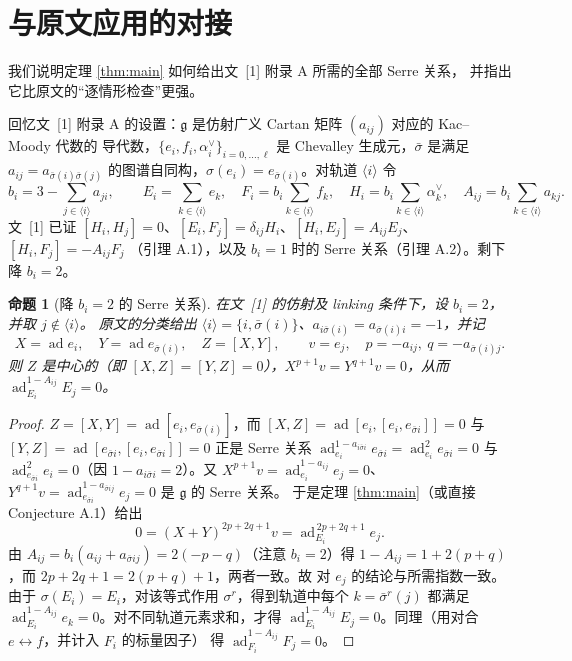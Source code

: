 \documentclass[11pt,UTF8]{ctexart}
\newtheorem{proposition}[theorem]{命题}
\theoremstyle{definition}
\newcommand{\ad}{\operatorname{ad}}
\newcommand{\g}{\mathfrak{g}}
\newcommand{\sbar}{\bar\sigma}
\begin{document}
\section{与原文应用的对接}\label{sec:app}

我们说明定理 \ref{thm:main} 如何给出文~[1] 附录 A 所需的全部 Serre 关系，
并指出它比原文的“逐情形检查”更强。

回忆文~[1] 附录 A 的设置：$\g$ 是仿射广义 Cartan 矩阵 $(a_{ij})$ 对应的 Kac--Moody 代数的
导代数，$\{e_i,f_i,\alpha_i^\vee\}_{i=0,\dots,\ell}$ 是 Chevalley 生成元，$\sbar$ 是满足
$a_{ij}=a_{\sbar(i)\sbar(j)}$ 的图谱自同构，$\sigma(e_i)=e_{\sbar(i)}$。对轨道 $\langle i\rangle$ 令
\[
b_i=3-\sum_{j\in\langle i\rangle}a_{ji},\qquad
E_i=\sum_{k\in\langle i\rangle}e_k,\quad
F_i=b_i\sum_{k\in\langle i\rangle}f_k,\quad
H_i=b_i\sum_{k\in\langle i\rangle}\alpha_k^\vee,\quad
A_{ij}=b_i\sum_{k\in\langle i\rangle}a_{kj}.
\]
文~[1] 已证 $[H_i,H_j]=0$、$[E_i,F_j]=\delta_{ij}H_i$、$[H_i,E_j]=A_{ij}E_j$、$[H_i,F_j]=-A_{ij}F_j$
（引理 A.1），以及 $b_i=1$ 时的 Serre 关系（引理 A.2）。剩下降 $b_i=2$。

\begin{proposition}[降 $b_i=2$ 的 Serre 关系]\label{prop:serre}
在文~[1] 的仿射及 linking 条件下，设 $b_i=2$，并取 $j\notin\langle i\rangle$。
原文的分类给出 $\langle i\rangle=\{i,\sbar(i)\}$、$a_{i\sbar(i)}=a_{\sbar(i)i}=-1$，并记
\[
X=\ad e_i,\quad Y=\ad e_{\sbar(i)},\quad Z=[X,Y],\qquad v=e_j,\quad p=-a_{ij},\ q=-a_{\sbar(i)j}.
\]
则 $Z$ 是中心的（即 $[X,Z]=[Y,Z]=0$），$X^{p+1}v=Y^{q+1}v=0$，从而
$\ad_{E_i}^{1-A_{ij}}E_j=0$。
\end{proposition}

\begin{proof}
$Z=[X,Y]=\ad[e_i,e_{\sbar(i)}]$，而 $[X,Z]=\ad[e_i,[e_i,e_{\sbar i}]]=0$ 与
$[Y,Z]=\ad[e_{\sbar i},[e_i,e_{\sbar i}]]=0$ 正是 Serre 关系
$\ad_{e_i}^{1-a_{i\sbar i}}e_{\sbar i}=\ad_{e_i}^{2}e_{\sbar i}=0$ 与
$\ad_{e_{\sbar i}}^{2}e_i=0$（因 $1-a_{i\sbar i}=2$）。又 $X^{p+1}v=\ad_{e_i}^{1-a_{ij}}e_j=0$、
$Y^{q+1}v=\ad_{e_{\sbar i}}^{1-a_{\sbar i j}}e_j=0$ 是 $\g$ 的 Serre 关系。
于是定理 \ref{thm:main}（或直接 Conjecture A.1）给出
\[
0=(X+Y)^{2p+2q+1}v=\ad_{E_i}^{\,2p+2q+1}e_j .
\]
由 $A_{ij}=b_i(a_{ij}+a_{\sbar i j})=2(-p-q)$（注意 $b_i=2$）得
$1-A_{ij}=1+2(p+q)$，而 $2p+2q+1=2(p+q)+1$，两者一致。故
对 $e_j$ 的结论与所需指数一致。由于 $\sigma(E_i)=E_i$，对该等式作用 $\sigma^r$，得到轨道中每个
$k=\bar\sigma^r(j)$ 都满足 $\ad_{E_i}^{1-A_{ij}}e_k=0$。对不同轨道元素求和，才得
$\ad_{E_i}^{1-A_{ij}}E_j=0$。同理（用对合 $e\leftrightarrow f$，并计入 $F_i$ 的标量因子）
得 $\ad_{F_i}^{1-A_{ij}}F_j=0$。
\end{proof}
\end{document}
